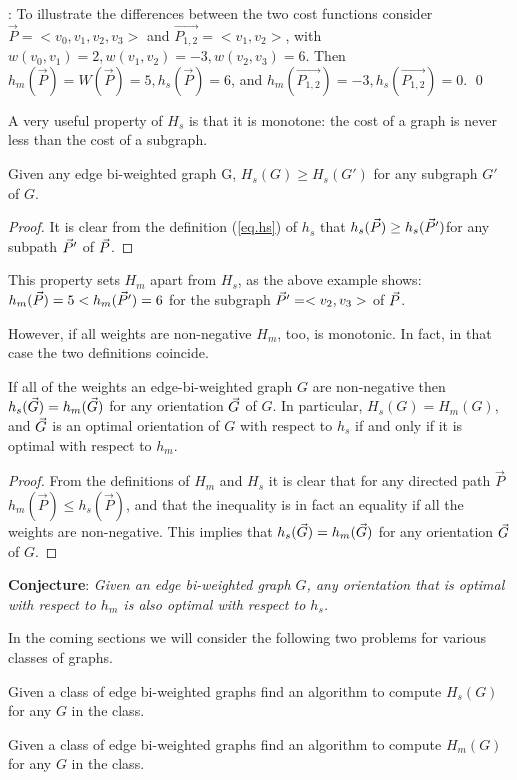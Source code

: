 : To illustrate the differences between the two cost functions consider
 $\vec{P}=<v_0,v_1,v_2,v_3>$ and $\vec{P_{1,2}}=<v_1,v_2>$, with $w(v_0,v_1)=2, w(v_1,v_2)=-3,w(v_2,v_3)=6$.
 Then $h_m(\vec{P})=W(\vec{P})=5, h_s(\vec{P})=6$, and 
 $h_m(\vec{P_{1,2}})=-3, h_s(\vec{P_{1,2}})=0$.
 \qed

A very useful property of $H_s$ is that it is monotone: the cost of a graph is never less than the cost of a subgraph.
\begin{lemma}\label{lem:sprop}
	Given any edge bi-weighted graph G,
	$H_{s}(G)\geq  H_{s}(G')$ for any subgraph $G'$ of $G$. 
\end{lemma}

\begin{proof}
It is clear from the definition (\ref{eq.hs}) of $h_s$ that $h_s(\vec{P})\geq h_s(\vec{P} ')$for any subpath 
$\vec{P} '$ of $\vec{P}$.  
\end{proof}

This property sets $H_m$ apart from $H_s$,  as the above example shows:
$h_{m}(\vec{P})=5 <  h_{m}(\vec{P}')=6$ for the subgraph $\vec{P} '=<v_2,v_3>$ of $\vec{P}$.

However, if all weights are non-negative $H_m$, too, is monotonic. In fact, in that case the two definitions coincide.

\begin{lemma}
	If all of the weights an edge-bi-weighted graph $G$ are non-negative 
	then $h_{s}( \vec{G} )= h_{m}( \vec{G} )$ for any orientation $\vec{G}$ of $G$.
	In particular,  $H_{s}(G)= H_{m}(G)$,  and 
	$\vec{G}$ is an optimal orientation of $G$ with respect to $h_{s}$
	if and only if it is optimal with respect to $ h_{m} $.
\end{lemma}
\begin{proof}
From the definitions of $H_m$ and $H_s$ it is clear that for any directed path $\vec{P}$ $h_{m}(\vec{P})\leq  h_{s}(\vec{P})$, and that the inequality is in fact an equality if all the weights 
are non-negative. This implies that $h_{s}( \vec{G} )= h_{m}( \vec{G} )$ for any orientation $\vec{G}$ of $G$.
\end{proof}

\bigskip
{\bf Conjecture}:
\textit{Given an edge bi-weighted graph $G$, any orientation that is optimal with 
	respect to $h_{m}$ is also optimal with respect to $h_{s} $.}

\bigskip
In the coming sections we will consider the following two problems
for various classes of graphs.

\begin{problem}[
	HS]
	Given a class of edge bi-weighted graphs find an algorithm to compute
	$H_s(G) $
	for any $G$
	in the class.
\end{problem}

\begin{problem}[
	HM]
	Given a class of edge bi-weighted graphs find an algorithm to compute $H_m(G) $
	for any $G$
	in the class.
\end{problem}
